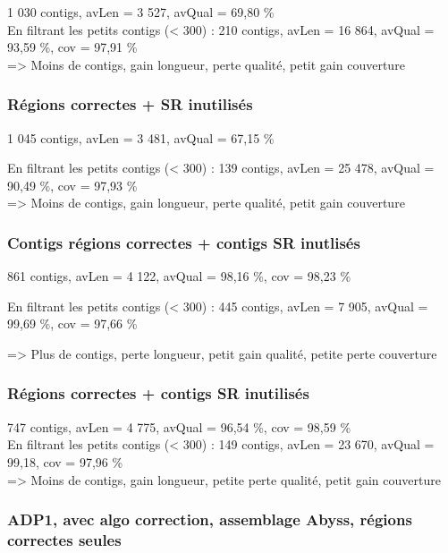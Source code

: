 \documentclass[12pt]{article}
\begin{document}
1 030 contigs, avLen = 3 527, avQual = 69,80 \% \\

En filtrant les petits contigs (< 300) : 210 contigs, avLen = 16 864, avQual = 93,59 \%, cov = 97,91 \% \\

=> Moins de contigs, gain longueur, perte qualité, petit gain couverture

\subsubsection{Régions correctes + SR inutilisés}

1 045 contigs, avLen = 3 481, avQual = 67,15 \%

En filtrant les petits contigs (< 300) : 139 contigs, avLen = 25 478, avQual = 90,49 \%, cov = 97,93 \% \\

=> Moins de contigs, gain longueur, perte qualité, petit gain couverture

\subsubsection{Contigs régions correctes + contigs SR inutlisés}

861 contigs, avLen = 4 122, avQual = 98,16 \%, cov = 98,23 \%

En filtrant les petits contigs (< 300) : 445 contigs, avLen = 7 905, avQual = 99,69 \%, cov = 97,66 \%

=> Plus de contigs, perte longueur, petit gain qualité, petite perte couverture

\subsubsection{Régions correctes + contigs SR inutilisés}

747 contigs, avLen = 4 775, avQual = 96,54 \%, cov = 98,59 \% \\

En filtrant les petits contigs (< 300) : 149 contigs, avLen = 23 670, avQual = 99,18, cov = 97,96 \% \\

=> Moins de contigs, gain longueur, petite perte qualité, petit gain couverture

\subsubsection{ADP1, avec algo correction, assemblage Abyss, régions correctes seules}
\end{document}
